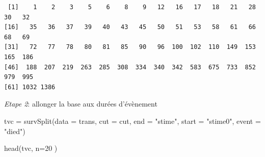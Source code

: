 \documentclass[
  12pt,
  letterpaper,
  DIV=11,
  numbers=noendperiod,
  onepage,
  openany]{scrreprt}
\newenvironment{Shaded}{\begin{snugshade}}{\end{snugshade}}
\newcommand{\AttributeTok}[1]{\textcolor[rgb]{0.80,0.80,0.80}{#1}}
\newcommand{\DecValTok}[1]{\textcolor[rgb]{0.86,0.86,0.80}{#1}}
\newcommand{\FunctionTok}[1]{\textcolor[rgb]{0.94,0.94,0.56}{#1}}
\newcommand{\NormalTok}[1]{\textcolor[rgb]{0.80,0.80,0.80}{#1}}
\newcommand{\OtherTok}[1]{\textcolor[rgb]{0.94,0.94,0.56}{#1}}
\newcommand{\SpecialCharTok}[1]{\textcolor[rgb]{0.86,0.64,0.64}{#1}}
\newcommand{\StringTok}[1]{\textcolor[rgb]{0.80,0.58,0.58}{#1}}
\begin{document}
\begin{Shaded}
\end{Shaded}

\begin{verbatim}
 [1]    1    2    3    5    6    8    9   12   16   17   18   21   28   30   32
[16]   35   36   37   39   40   43   45   50   51   53   58   61   66   68   69
[31]   72   77   78   80   81   85   90   96  100  102  110  149  153  165  186
[46]  188  207  219  263  285  308  334  340  342  583  675  733  852  979  995
[61] 1032 1386
\end{verbatim}

\emph{Etape 2}: allonger la base aux durées d'évènement

\begin{Shaded}
\begin{Highlighting}[]
\NormalTok{tvc }\OtherTok{=} \FunctionTok{survSplit}\NormalTok{(}\AttributeTok{data =}\NormalTok{ trans, }\AttributeTok{cut =}\NormalTok{ cut, }\AttributeTok{end =} \StringTok{"stime"}\NormalTok{, }\AttributeTok{start =} \StringTok{"stime0"}\NormalTok{, }\AttributeTok{event =} \StringTok{"died"}\NormalTok{)}

\FunctionTok{head}\NormalTok{(tvc, }\AttributeTok{n=}\DecValTok{20}\NormalTok{ )}
\end{Highlighting}
\end{Shaded}
\end{document}
